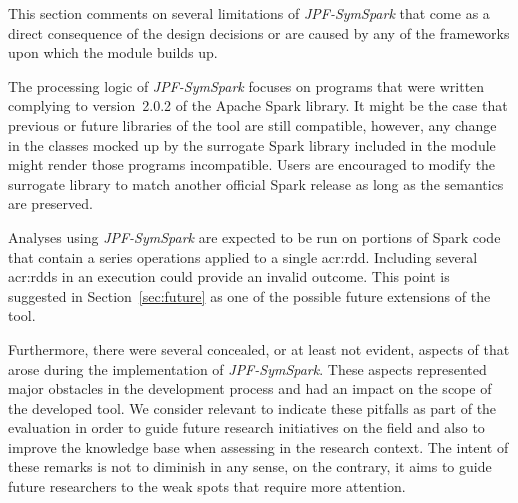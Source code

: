 \label{sec:limitations}

%
%
%
%
%

This section comments on several limitations of \textit{JPF-SymSpark} that come as a direct consequence of the design decisions or are caused by any of the frameworks upon which the module builds up.

The processing logic of \textit{JPF-SymSpark} focuses on programs that were written complying to version~2.0.2 of the Apache Spark library. It might be the case that previous or future libraries of the tool are still compatible, however, any change in the classes mocked up by the surrogate Spark library included in the module might render those programs incompatible. Users are encouraged to modify the surrogate library to match another official Spark release as long as the semantics are preserved.

Analyses using \textit{JPF-SymSpark} are expected to be run on portions of Spark code that contain a series operations applied to a single \acrshort{acr:rdd}. Including several \acrshort{acr:rdd}s in an execution could provide an invalid outcome. This point is suggested in Section~\ref{sec:future} as one of the possible future extensions of the tool.

Furthermore, there were several concealed, or at least not evident, aspects of \spf{} that arose during the implementation of \textit{JPF-SymSpark}. These aspects represented major obstacles in the development process and had an impact on the scope of the developed tool. We consider relevant to indicate these pitfalls as part of the evaluation in order to guide future research initiatives on the field and also to improve the knowledge base when assessing \spf{} in the research context. The intent of these remarks is not to diminish \spf{} in any sense, on the contrary, it aims to guide future researchers to the weak spots that require more attention.

